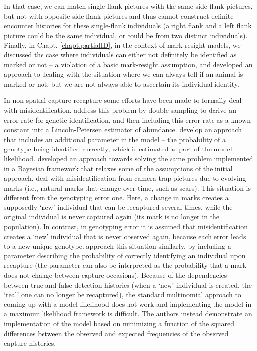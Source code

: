 In that case, we can match single-flank pictures with the same
side flank pictures, but not with opposite side flank pictures and
thus cannot construct definite encounter histories for these
single-flank individuals (a right flank and a left flank picture could
be the same individual, or could be from two distinct
individuals). Finally, in Chapt. \ref{chapt.partialID}, in the context
of mark-resight models, we discussed the case where individuals can
either not definitely be identified as marked or not -- a violation of
a basic mark-resight assumption, and developed an approach to dealing
with the situation where we can always tell if an animal is marked or
not, but we are not always able to ascertain its individual identity.

In non-spatial capture recapture some efforts have been made to
formally deal with misidentification. \citet{stevick_etal:2001}
address this problem by double-sampling to derive an error rate for
genetic identification, and then including this error rate as a known
constant into a Lincoln-Petersen estimator of
abundance. \citet{lukacs_burnham:2005} develop an approach that
includes an additional parameter in the model -- the probability of a
genotype being identified correctly, which is estimated as part of the
model likelihood. \citet{link_etal:2010} developed an approach towards
solving the same problem implemented in a Bayesian framework that
relaxes some of the assumptions of the initial approach.
\citet{yoshizaki_etal:2009} deal with misidentification from camera
trap pictures due to evolving marks (i.e., natural marks that change
over time, such as scars). This situation is different from the
genotyping error one. Here, a change in marks creates a supposedly
`new' individual that can be recaptured several times, while the
original individual is never captured again (its mark is no longer in
the population). In contrast, in genotyping error it is assumed that
misidentification creates a `new' individual that is never observed
again, because each error leads to a new unique
genotype. \citet{yoshizaki_etal:2009} approach this situation
similarly, by including a parameter describing the probability of
correctly identifying an individual upon recapture (the parameter can
also be interpreted as the probability that a mark does not change
between capture occasions). Because of the dependencies between true
and false detection histories (when a `new' individual is created, the
`real' one can no longer be recaptured), the standard multinomial
approach to coming up with a model likelihood does not work and
implementing the model in a maximum likelihood framework is
difficult. The authors instead demonstrate an implementation of the
model based on minimizing a function of the squared differences
between the observed and expected frequencies of the observed capture
histories.

